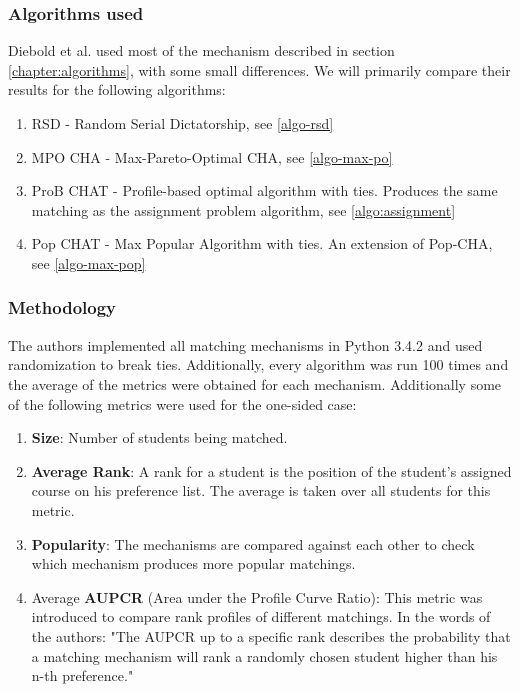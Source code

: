 \subsubsection{Algorithms used}
Diebold et al. used most of the mechanism described in section \ref{chapter:algorithms}, with some small differences. We will primarily compare their results for the following algorithms:
\begin{enumerate}
    \item RSD - Random Serial Dictatorship, see \ref{algo-rsd}
    \item MPO CHA - Max-Pareto-Optimal CHA, see \ref{algo-max-po}
    \item ProB CHAT - Profile-based optimal algorithm with ties. Produces the same matching as the assignment problem algorithm, see \ref{algo:assignment}
    \item Pop CHAT - Max Popular Algorithm with ties. An extension of Pop-CHA, see \ref{algo-max-pop}
\end{enumerate}

\subsubsection{Methodology}
The authors implemented all matching mechanisms in Python 3.4.2 and used randomization to break ties. Additionally, every algorithm was run 100 times and the average of the metrics were obtained for each mechanism. Additionally some of the following metrics were used for the one-sided case:
\begin{enumerate}
    \item \textbf{Size}: Number of students being matched.
    \item \textbf{Average Rank}: A rank for a student is the position of the student's assigned course on his preference list. The average is taken over all students for this metric.
    \item \textbf{Popularity}: The mechanisms are compared against each other to check which mechanism produces more popular matchings. 
    \item Average \textbf{AUPCR} (Area under the Profile Curve Ratio): This metric was introduced to compare rank profiles of different matchings. In the words of the authors: "The AUPCR up to a specific rank describes the probability that a matching mechanism will rank a randomly chosen student higher than his n-th preference."\cite{DieboldBenchmark}
\end{enumerate}

